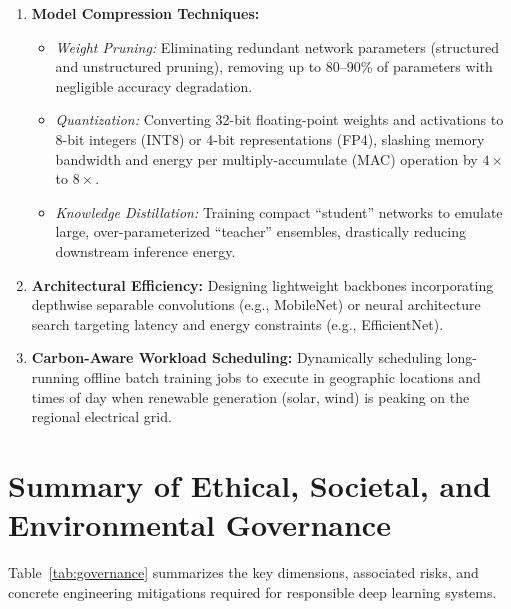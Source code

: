\documentclass[12pt,a4paper]{article}
\begin{document}
\begin{enumerate}[leftmargin=*]
    \item \textbf{Model Compression Techniques:}
    \begin{itemize}
        \item \textit{Weight Pruning:} Eliminating redundant network parameters (structured and unstructured pruning), removing up to 80--90\% of parameters with negligible accuracy degradation.
        \item \textit{Quantization:} Converting 32-bit floating-point weights and activations to 8-bit integers (INT8) or 4-bit representations (FP4), slashing memory bandwidth and energy per multiply-accumulate (MAC) operation by $4\times$ to $8\times$.
        \item \textit{Knowledge Distillation:} Training compact ``student'' networks to emulate large, over-parameterized ``teacher'' ensembles, drastically reducing downstream inference energy.
    \end{itemize}
    \item \textbf{Architectural Efficiency:} Designing lightweight backbones incorporating depthwise separable convolutions (e.g., MobileNet) or neural architecture search targeting latency and energy constraints (e.g., EfficientNet).
    \item \textbf{Carbon-Aware Workload Scheduling:} Dynamically scheduling long-running offline batch training jobs to execute in geographic locations and times of day when renewable generation (solar, wind) is peaking on the regional electrical grid.
\end{enumerate}

\section{Summary of Ethical, Societal, and Environmental Governance}
Table~\ref{tab:governance} summarizes the key dimensions, associated risks, and concrete engineering mitigations required for responsible deep learning systems.
\end{document}
